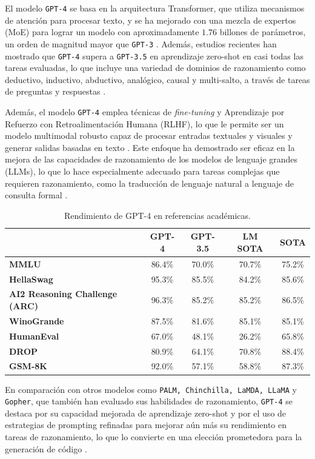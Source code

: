 El modelo  \texttt{GPT-4} se basa en la arquitectura Transformer, que utiliza mecanismos de atención para procesar texto, y se ha mejorado con una mezcla de expertos (MoE) para lograr un modelo con aproximadamente $1.76$ billones de parámetros, un orden de magnitud mayor que  \texttt{GPT-3} \cite{gpt4}. Además, estudios recientes han mostrado que \texttt{GPT-4} supera a  \texttt{GPT-3.5} en aprendizaje zero-shot en casi todas las tareas evaluadas, lo que incluye una variedad de dominios de razonamiento como deductivo, inductivo, abductivo, analógico, causal y multi-salto, a través de tareas de preguntas y respuestas \cite{gpt4}.

Además, el modelo  \texttt{GPT-4} emplea técnicas de \textit{fine-tuning} y Aprendizaje por Refuerzo con Retroalimentación Humana (RLHF), lo que le permite ser un modelo multimodal robusto capaz de procesar entradas textuales y visuales y generar salidas basadas en texto \cite{gpt4}. Este enfoque ha demostrado ser eficaz en la mejora de las capacidades de razonamiento de los modelos de lenguaje grandes (LLMs), lo que lo hace especialmente adecuado para tareas complejas que requieren razonamiento, como la traducción de lenguaje natural a lenguaje de consulta formal \cite{gpt4all}.

\begin{table}[H]
  \centering
  \caption{Rendimiento de GPT-4 en referencias académicas. \cite{gpt4}}
  \begin{tabularx}{\textwidth}{Xcccc}
    \toprule
    & \textbf{GPT-4} & \textbf{GPT-3.5} & \textbf{LM SOTA} & \textbf{SOTA} \\
    \midrule
    \textbf{MMLU} & 86.4\% & 70.0\% & 70.7\% & 75.2\% \\
    \textbf{HellaSwag} & 95.3\% & 85.5\% & 84.2\% & 85.6\% \\
    \textbf{AI2 Reasoning Challenge (ARC)} & 96.3\% & 85.2\% & 85.2\% & 86.5\% \\
    \textbf{WinoGrande} & 87.5\% & 81.6\% & 85.1\% & 85.1\% \\
    \textbf{HumanEval} & 67.0\% & 48.1\% & 26.2\% & 65.8\% \\
    \textbf{DROP} & 80.9\% & 64.1\% & 70.8\% & 88.4\% \\
    \textbf{GSM-8K} & 92.0\% & 57.1\% & 58.8\% & 87.3\% \\
    \bottomrule
  \end{tabularx}
  \label{tab:my_label}
\end{table}

En comparación con otros modelos como \texttt{PALM, Chinchilla, LaMDA, LLaMA} y \texttt{Gopher}, que también han evaluado sus habilidades de razonamiento,  \texttt{GPT-4} se destaca por su capacidad mejorada de aprendizaje zero-shot y por el uso de estrategias de prompting refinadas para mejorar aún más su rendimiento en tareas de razonamiento, lo que lo convierte en una elección prometedora para la generación de código \cite{gpt4}.

